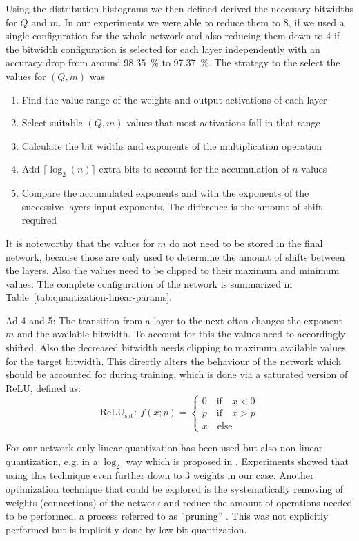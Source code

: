 Using the distribution histograms we then defined derived the necessary bitwidths for $Q$ and $m$. In our experiments we were able to reduce them to \SI{8}{\bit}, if we used a single configuration for the whole network and also reducing them down to \SI{4}{\bit} if the bitwidth configuration is selected for each layer independently with an accuracy drop from around \SI{98.35}{\percent} to \SI{97.37}{\percent}. The strategy to the select the values for $(Q,m)$ was
\begin{enumerate}
	\item Find the value range of the weights and output activations of each layer
	\item Select suitable $(Q,m)$ values that most activations fall in that range
	\item Calculate the bit widths and exponents of the multiplication operation
	\item Add $\lceil \log_2(n) \rceil$ extra bits to account for the accumulation of $n$ values
	\item Compare the accumulated exponents and with the exponents of the successive layers input exponents. The difference is the amount of shift required
\end{enumerate}
It is noteworthy that the values for $m$ do not need to be stored in the final network, because those are only used to determine the amount of shifts between the layers. Also the values need to be clipped to their maximum and minimum values. The complete configuration of the network is summarized in Table~\ref{tab:quantization-linear-params}.

Ad 4 and 5: The transition from a layer to the next often changes the exponent $m$ and the available bitwidth. To account for this the values need to accordingly shifted. Also the decreased bitwidth needs clipping to maximum available values for the target bitwidth. This directly alters the behaviour of the network which should be accounted for during training, which is done via a saturated version of ReLU, defined as:
\begin{equation}
    \text{ReLU}_{\text{sat}}: ~ f(x;p) = \begin{cases}
		0 	\quad \text{if} \quad x < 0 \\
		p 	\quad \text{if} \quad x > p \\
		x	\quad \text{else}
	\end{cases}
\end{equation}

For our network only linear quantization has been used but also non-linear quantization, e.g. in a $\log_2$ way which is proposed in \cite{Lee:2017aa}. Experiments showed that using this technique even further down to \SI{3}{\bit} weights in our case.
Another optimization technique that could be explored is the systematically removing of weights (connections) of the network and reduce the amount of operations needed to be performed, a process referred to as ''pruning'' \cite{Zhu:2017aa}. This was not explicitly performed but is implicitly done by low bit quantization.

